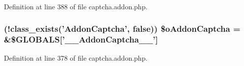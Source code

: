 Definition at line 388 of file captcha.\-addon.\-php.

\hypertarget{captcha_8addon_8php_ab9ab3bb5657fc72fca17e44743d1d20a}{
\subsubsection[{\$o\-Addon\-Captcha}]{ (!class\-\_\-exists('Addon\-Captcha', false)) \$o\-Addon\-Captcha = \&\$G\-L\-O\-B\-A\-L\-S\mbox{[}'\-\_\-\-\_\-\-Addon\-Captcha\-\_\-\-\_\-'\mbox{]}}}\label{captcha_8addon_8php_ab9ab3bb5657fc72fca17e44743d1d20a}


Definition at line 378 of file captcha.\-addon.\-php.

